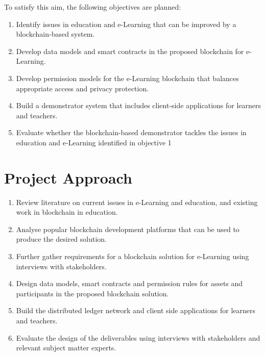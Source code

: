 To satisfy this aim, the following objectives are planned:

\begin{enumerate}
    \item Identify issues in education and e-Learning that can be improved by a blockchain-based system.
    \item Develop data models and smart contracts in the proposed blockchain for e-Learning.
    \item Develop permission models for the e-Learning blockchain that balances appropriate access and privacy protection.
    \item Build a demonstrator system that includes client-side applications for learners and teachers.
    \item Evaluate whether the blockchain-based demonstrator tackles the issues in education and e-Learning identified in objective 1
\end{enumerate}



\section{Project Approach} %

\begin{enumerate}
    \item Review literature on current issues in e-Learning and education, and existing work in blockchain in education.
    \item Analyse popular blockchain development platforms that can be used to produce the desired solution.
    \item Further gather requirements for a blockchain solution for e-Learning using interviews with stakeholders.
    \item Design data models, smart contracts and permission rules for assets and participants in the proposed blockchain solution.
    \item Build the distributed ledger network and client side applications for learners and teachers.
    \item Evaluate the design of the deliverables using interviews with stakeholders and relevant subject matter experts.
\end{enumerate}

